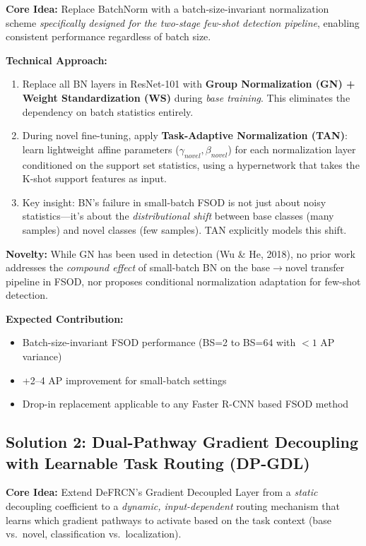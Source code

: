 \documentclass[11pt,a4paper]{article}
\begin{document}
\textbf{Core Idea:} Replace BatchNorm with a batch-size-invariant normalization scheme \textit{specifically designed for the two-stage few-shot detection pipeline}, enabling consistent performance regardless of batch size.

\textbf{Technical Approach:}
\begin{enumerate}[nosep]
    \item Replace all BN layers in ResNet-101 with \textbf{Group Normalization (GN) + Weight Standardization (WS)} during \textit{base training}. This eliminates the dependency on batch statistics entirely.
    \item During novel fine-tuning, apply \textbf{Task-Adaptive Normalization (TAN)}: learn lightweight affine parameters ($\gamma_{novel}, \beta_{novel}$) for each normalization layer conditioned on the support set statistics, using a hypernetwork that takes the K-shot support features as input.
    \item Key insight: BN's failure in small-batch FSOD is not just about noisy statistics---it's about the \textit{distributional shift} between base classes (many samples) and novel classes (few samples). TAN explicitly models this shift.
\end{enumerate}

\textbf{Novelty:} While GN has been used in detection (Wu \& He, 2018), no prior work addresses the \textit{compound effect} of small-batch BN on the base$\rightarrow$novel transfer pipeline in FSOD, nor proposes conditional normalization adaptation for few-shot detection.

\textbf{Expected Contribution:}
\begin{itemize}[nosep]
    \item Batch-size-invariant FSOD performance (BS=2 to BS=64 with $<1$ AP variance)
    \item +2--4 AP improvement for small-batch settings
    \item Drop-in replacement applicable to any Faster R-CNN based FSOD method
\end{itemize}

\subsection{Solution 2: Dual-Pathway Gradient Decoupling with Learnable Task Routing (DP-GDL)}

\textbf{Core Idea:} Extend DeFRCN's Gradient Decoupled Layer from a \textit{static} decoupling coefficient to a \textit{dynamic, input-dependent} routing mechanism that learns which gradient pathways to activate based on the task context (base vs.\ novel, classification vs.\ localization).
\end{document}
